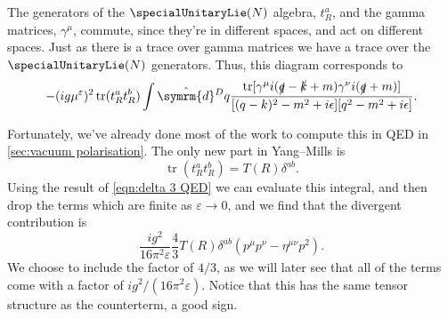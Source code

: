 \documentclass[fleqn]{NotesClass}
\newcommand{\dhat}[1]{\hat{\symrm{d}}{#1}}
\newcommand{\minkowskiMetric}{\eta}
\DeclareMathOperator{\tr}{tr}
\begin{document}
    The generators of the \(\specialUnitaryLie(N)\) algebra, \(t_R^a\), and the gamma matrices, \(\gamma^\mu\), commute, since they're in different spaces, and act on different spaces.
    Just as there is a trace over gamma matrices we have a trace over the \(\specialUnitaryLie(N)\) generators.
    Thus, this diagram corresponds to
    \begin{equation}
        -(ig\mu^\varepsilon)^2 \tr(t_R^a t_R^b) \int \dhat{^Dq} \frac{\tr[\gamma^\mu i(\slashed{q} - \slashed{k} + m) \gamma^\nu i(\slashed{q} + m)]}{[(q - k)^2 - m^2 + i\epsilon][q^2 - m^2 + i\epsilon]}.
    \end{equation}
    
    Fortunately, we've already done most of the work to compute this in QED in \cref{sec:vacuum polarisation}.
    The only new part in Yang--Mills is
    \begin{equation}
        \tr(t_R^a t_R^b) = T(R)\delta^{ab}.
    \end{equation}
    Using the result of \cref{eqn:delta 3 QED} we can evaluate this integral, and then drop the terms which are finite as \(\varepsilon \to 0\), and we find that the divergent contribution is
    \begin{equation}
        \frac{ig^2}{16\pi^2\varepsilon} \frac{4}{3}T(R)\delta^{ab}(p^\mu p^\nu - \minkowskiMetric^{\mu\nu}p^2).
    \end{equation}
    We choose to include the factor of \(4/3\), as we will later see that all of the terms come with a factor of \(ig^2/(16\pi^2\varepsilon)\).
    Notice that this has the same tensor structure as the counterterm, a good sign.
    
\end{document}
